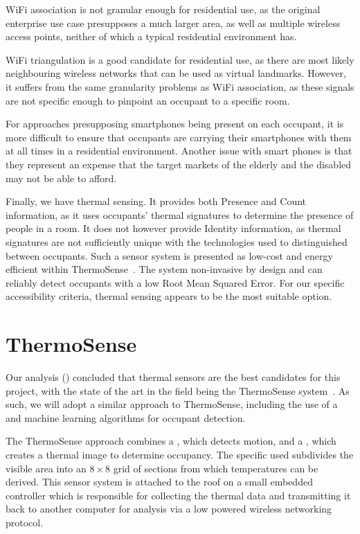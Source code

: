 \documentclass[../thesis/thesis.tex]{subfiles}
\begin{document}
WiFi association is not granular enough for residential use, as the original enterprise use case presupposes a much larger area, as well as multiple wireless access points, neither of which a typical residential environment has.

WiFi triangulation is a good candidate for residential use, as there are most likely neighbouring wireless networks that can be used as virtual landmarks. However, it suffers from the same granularity problems as WiFi association, as these signals are not specific enough to pinpoint an occupant to a specific room.

For approaches presupposing smartphones being present on each occupant, it is more difficult to ensure that occupants are carrying their smartphones with them at all times in a residential environment.  Another issue with smart phones is that they represent an expense that the target markets of the elderly and the disabled may not be able to afford.

Finally, we have thermal sensing. It provides both Presence and Count information, as it uses occupants' thermal signatures to determine the presence of people in a room. It does not however provide Identity information, as thermal signatures are not sufficiently unique with the technologies used to distinguished between occupants. Such a sensor system is presented as low-cost and energy efficient within ThermoSense~\cite{beltran2013thermosense}. The system non-invasive by design and can reliably detect occupants with a low Root Mean Squared Error. For our specific accessibility criteria, thermal sensing appears to be the most suitable option.

\section{ThermoSense}
\label{sec:litreview:thermalsensors}
Our analysis () concluded that thermal sensors are the best candidates for this project, with the state of the art in the field being the ThermoSense system~\cite{beltran2013thermosense}. As such, we will adopt a similar approach to ThermoSense, including the use of a \iar and machine learning algorithms for occupant detection.

The ThermoSense approach combines a \pir, which detects motion, and a \iar, which creates a thermal image to determine occupancy. The specific \iar used subdivides the visible area into an $8\times8$ grid of sections from which temperatures can be derived. This sensor system is attached to the roof on a small embedded controller which is responsible for collecting the thermal data and transmitting it back to another computer for analysis via a low powered wireless networking protocol. 
\end{document}
